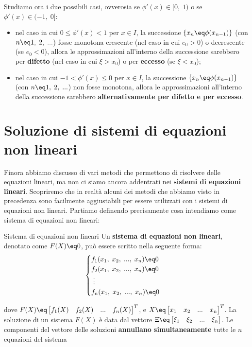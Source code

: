 Studiamo ora i due possibili casi, ovverosia se $\phi'(x) \in [0, \; 1)$ o se $\phi'(x) \in (-1, \; 0]$:
\begin{itemize}
    \item nel caso in cui $0 \leq \phi'(x) < 1$ per $x \in I$, la successione $\{x_n \eq \phi(x_{n - 1})\}$ (con $n \eq 1, \; 2, \; ...$) fosse monotona crescente (nel caso in cui $e_0 > 0$) o decrescente (se $e_0 < 0$), allora le approssimazioni all'interno della successione sarebbero per \textbf{difetto} (nel caso in cui $\xi > x_0$) o per \textbf{eccesso} (se $\xi < x_0$);
    \item nel caso in cui $-1 < \phi'(x) \leq 0$ per $x \in I$, la successione $\{x_n \eq \phi(x_{n - 1})\}$ (con $n \eq 1, \; 2, \; ...$) non fosse monotona, allora le approssimazioni all'interno della successione sarebbero \textbf{alternativamente per difetto e per eccesso}.
\end{itemize}

\section{Soluzione di sistemi di equazioni non lineari}

Finora abbiamo discusso di vari metodi che permettono di risolvere delle equazioni lineari, ma non ci siamo ancora addentrati nei \textbf{sistemi di equazioni lineari}. Scopriremo che in realtà alcuni dei metodi che abbiamo visto in precedenza sono facilmente aggiustabili per essere utilizzati con i sistemi di equazioni non lineari. Partiamo definendo precisamente cosa intendiamo come sistema di equazioni non lineari:

\begin{definition}{Sistema di equazioni non lineari}
    Un \textbf{sistema di equazioni non lineari}, denotato come $F(X) \eq 0$, può essere scritto nella seguente forma:
    \[ \begin{cases}
        f_1 (x_1, \; x_2, \; ..., \; x_n) \eq 0 \\
        f_2 (x_1, \; x_2, \; ..., \; x_n) \eq 0 \\
        \; \vdots \\
        f_n (x_1, \; x_2, \; ..., \; x_n) \eq 0 \\
    \end{cases} \]

    dove $F(X) \eq \begin{bmatrix} f_1(X) & f_2(X) & ... & f_n(X) \end{bmatrix}^T$, e $X \eq \begin{bmatrix} x_1 & x_2 & ... & x_n \end{bmatrix}^T$. La soluzione di un sistema $F(X)$ è data dal vettore $\Xi \eq \begin{bmatrix} \xi_1 & \xi_2 & ... & \xi_n \end{bmatrix}$. Le componenti del vettore delle soluzioni \textbf{annullano simultaneamente} tutte le $n$ equazioni del sistema
\end{definition}

